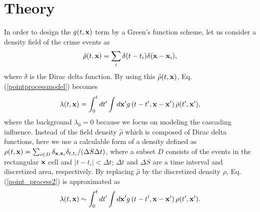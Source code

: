 \documentclass[review]{elsarticle}
\newcommand{\bv}[1]{{\bf #1}}
\newcommand{\Dt}{\Delta t}
\newcommand{\lr}[1]{\left(#1\right)}
\begin{document}

\section{Theory}\label{sec:theory}

In order to design the $g(t,\bv{x})$ term by a Green's function scheme,
let us consider a density field of the crime events as
\begin{eqnarray}
\hat{\rho}(t,\bv{x}) = \sum_{i}\delta(t-t_i)\delta(\bv{x}-\bv{x}_i),
\nonumber
\end{eqnarray}
where $\delta$ is the Dirac delta function.
By  using this $\hat{\rho}(t,\bv{x})$,
Eq. (\ref{pointprocessmodel}) becomes
\begin{eqnarray}
\lambda(t,\bv{x})
 = \int_0^t dt' \int d\bv{x}' g\lr{t-t',\bv{x}-\bv{x}'} \hat{\rho}(t',\bv{x}'),
\label{point_process2}
\end{eqnarray}
where the background $\lambda_0 = 0$ because we focus on modeling the cascading influence.
Instead of the field density $\hat \rho$ which
 is composed of Dirac delta functions,
 here we use a calculable form of a  density defined as
 $\rho(t,\bv{x}) = \sum_{i\in D} \delta_{\bv{x},\bv{x}_i} \delta_{t, t_i}/ (\Delta  S \Delta t) $,
 where a subset $D$ consists of the events in the rectangular $\bv{x}$ cell
  and $|t-t_i|<\Delta t$;
$\Dt$ and $\Delta S$ are a time interval and discretized area, respectively.
By replacing $\hat{\rho}$ by the discretized density $\rho$, Eq. (\ref{point_process2}) is approximated as
\begin{eqnarray}
\lambda(t,\bv{x})
 \sim \int_0^t dt' \int d\bv{x}' g\lr{t-t',\bv{x}-\bv{x}'} \rho(t',\bv{x}').
\label{point_process3}
\end{eqnarray}
\end{document}
